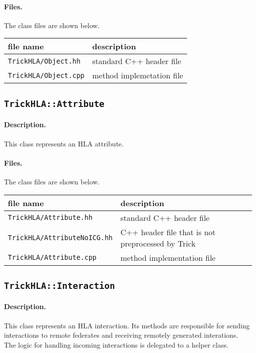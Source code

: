 \paragraph{Files.}
The class files are shown below.
   
{
  \scriptsize
  \begin{tabular}{|l|l|} 
    \hline
    file name & description \\
    \hline \hline
    {\tt TrickHLA/Object.hh} 
    & standard C++ header file
    \\ \hline
    {\tt TrickHLA/Object.cpp} 
    & method implemetation file
    \\ \hline
  \end{tabular}
}

\subsection{{\tt TrickHLA::Attribute}}

\paragraph{Description.}
This class represents an HLA attribute.

\paragraph{Files.}
The class files are shown below.
   
{
  \scriptsize
  \begin{tabular}{|l|l|} 
    \hline
    file name & description \\
    \hline \hline
    {\tt TrickHLA/Attribute.hh} 
    & standard C++ header file
    \\ \hline
    {\tt TrickHLA/AttributeNoICG.hh} 
    & C++ header file that is not preprocessed by Trick
    \\ \hline
    {\tt TrickHLA/Attribute.cpp} 
    & method implementation file
    \\ \hline
  \end{tabular}
}

\subsection{{\tt TrickHLA::Interaction}}

\paragraph{Description.}
This class represents an HLA interaction.
Its methods are responsible for sending interactions to remote federates
and receiving remotely generated interations.  
The logic for handling incoming interactions is delegated to a
helper class.

